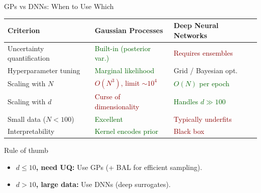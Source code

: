 \documentclass[aspectratio=169,11pt]{beamer}
\begin{document}
\begin{frame}{GPs vs DNNs: When to Use Which}
\begin{center}
\small
\begin{tabular}{l l l}
\toprule
\textbf{Criterion} & \textbf{Gaussian Processes} & \textbf{Deep Neural Networks} \\
\midrule
Uncertainty quantification & \textcolor{darkgreen}{Built-in (posterior var.)} & \textcolor{darkred}{Requires ensembles} \\
Hyperparameter tuning & \textcolor{darkgreen}{Marginal likelihood} & \textcolor{softorange}{Grid / Bayesian opt.} \\
Scaling with $N$ & \textcolor{darkred}{$O(N^3)$, limit $\sim 10^4$} & \textcolor{darkgreen}{$O(N)$ per epoch} \\
Scaling with $d$ & \textcolor{darkred}{Curse of dimensionality} & \textcolor{darkgreen}{Handles $d \gg 100$} \\
Small data ($N < 100$) & \textcolor{darkgreen}{Excellent} & \textcolor{darkred}{Typically underfits} \\
Interpretability & \textcolor{darkgreen}{Kernel encodes prior} & \textcolor{darkred}{Black box} \\
\bottomrule
\end{tabular}
\end{center}

\vspace{0.3cm}
\begin{alertblock}{Rule of thumb}
\begin{itemize}
  \item \textbf{$d \leq 10$, need UQ:} Use GPs (+ BAL for efficient sampling).
  \item \textbf{$d > 10$, large data:} Use DNNs (deep surrogates).
\end{itemize}
\end{alertblock}
\end{frame}
\end{document}
